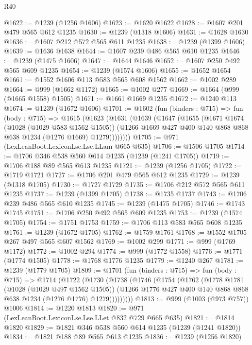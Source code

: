 \begin{lexlean}{R40}
\begin{coremodule}
@1622 := @1239 (@1256 @1606)
@1623 := @1620 @1622
@1628 := @1607 @201 @479 @565 @612 @1235
@1630 := @1239 (@1318 @1606)
@1631 := @1628 @1630
@1636 := @1607 @212 @572 @565 @611 @1235
@1638 := @1239 (@1399 @1606)
@1639 := @1636 @1638
@1644 := @1607 @239 @486 @565 @610 @1235
@1646 := @1239 (@1475 @1606)
@1647 := @1644 @1646
@1652 := @1607 @250 @492 @565 @609 @1235
@1654 := @1239 (@1574 @1606)
@1655 := @1652 @1654
@1661 := @1552 @1606 @113 @583 @565 @608 @1562
@1662 := @1002 @289
@1664 := @999 (@1662 @1172)
@1665 := @1002 @277
@1669 := @1664 (@999 (@1665 @1558) @1505)
@1671 := @1661 @1669 @1235
@1672 := @1240 @113
@1674 := @1239 (@1672 @1606)
@1701 := @1602
    (fun (binders : @715) =>
    fun (body : @715) =>
    @1615
      (@1623
        (@1631
          (@1639
            (@1647
              (@1655
                (@1671
                  @1674
                  (@1028 (@1029 @583 @1562 @1505))
                  (@1266 @1669 @427 @400 @140 @868 @868 @638 @1234 (@1276 @1669) @1279))))))))
@1705 := @971 (LexLeanBoot.LexiconLse.Lse.LLam @665 @635)
@1706 := @1506 @1705
@1714 := @1706 @346 @538 @560 @614 @1235 (@1239 (@1241 @1705))
@1719 := @1706 @188 @89 @565 @613 @1235
@1721 := @1239 (@1256 @1705)
@1722 := @1719 @1721
@1727 := @1706 @201 @479 @565 @612 @1235
@1729 := @1239 (@1318 @1705)
@1730 := @1727 @1729
@1735 := @1706 @212 @572 @565 @611 @1235
@1737 := @1239 (@1399 @1705)
@1738 := @1735 @1737
@1743 := @1706 @239 @486 @565 @610 @1235
@1745 := @1239 (@1475 @1705)
@1746 := @1743 @1745
@1751 := @1706 @250 @492 @565 @609 @1235
@1753 := @1239 (@1574 @1705)
@1754 := @1751 @1753
@1759 := @1706 @113 @583 @565 @608 @1235
@1761 := @1239 (@1672 @1705)
@1762 := @1759 @1761
@1768 := @1552 @1705 @267 @497 @565 @607 @1562
@1769 := @1002 @299
@1771 := @999 (@1769 @1172)
@1772 := @1002 @294
@1774 := @999 (@1772 @1558)
@1776 := @1771 (@1774 @1505)
@1778 := @1768 @1776 @1235
@1779 := @1240 @267
@1781 := @1239 (@1779 @1705)
@1809 := @1701
    (fun (binders : @715) =>
    fun (body : @715) =>
    @1714
      (@1722
        (@1730
          (@1738
            (@1746
              (@1754
                (@1762
                  (@1778
                    @1781
                    (@1028 (@1029 @497 @1562 @1505))
                    (@1266 @1776 @427 @400 @140 @868 @868 @638 @1234 (@1276 @1776) @1279)))))))))
@1813 := @999 (@1003 (@973 @757)) @1006
@1814 := @1220 @1813
@1820 := @971 (LexLeanBoot.LexiconLse.Lse.LLet @832 @729 @665 @635)
@1821 := @1814 @1820
@1829 := @1821 @346 @538 @560 @614 @1235 (@1239 (@1241 @1820))
@1834 := @1821 @188 @89 @565 @613 @1235
@1836 := @1239 (@1256 @1820)

\end{coremodule}
\end{lexlean}
